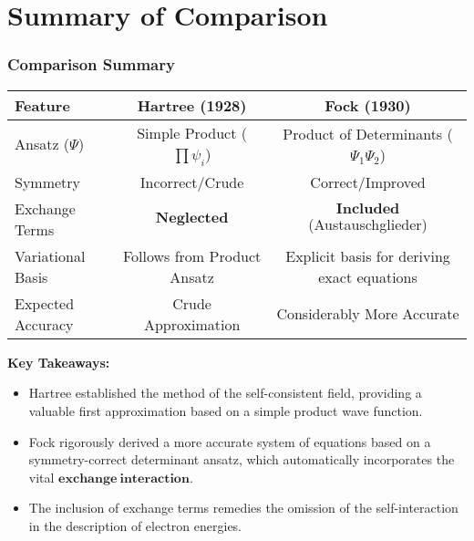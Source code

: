 \section{Summary of Comparison}
\begin{frame}
    \frametitle{Comparison Summary}
    \begin{center}
        \begin{tabular}{|l|c|c|}
            \hline
            \textbf{Feature} & \textbf{Hartree (1928)} & \textbf{Fock (1930)} \\
            \hline
            Ansatz ($\Psi$) & Simple Product ($\prod \psi_i$)  & Product of Determinants ($\Psi_1 \Psi_2$) \\
            \hline
            Symmetry & Incorrect/Crude  & Correct/Improved \\
            \hline
            Exchange Terms & $\mathbf{Neglected}$  & $\mathbf{Included}$ (Austauschglieder)  \\
            \hline
            Variational Basis & Follows from Product Ansatz  & Explicit basis for deriving exact equations  \\
            \hline
            Expected Accuracy & Crude Approximation  & Considerably More Accurate  \\
            \hline
        \end{tabular}
    \end{center}
    \vfill
    \textbf{Key Takeaways:}
    \begin{itemize}
        \item Hartree established the method of the self-consistent field, providing a valuable first approximation based on a simple product wave function.
        \item Fock rigorously derived a more accurate system of equations based on a symmetry-correct determinant ansatz, which automatically incorporates the vital $\mathbf{exchange~interaction}$.
        \item The inclusion of exchange terms remedies the omission of the self-interaction in the description of electron energies.
    \end{itemize}
\end{frame}

